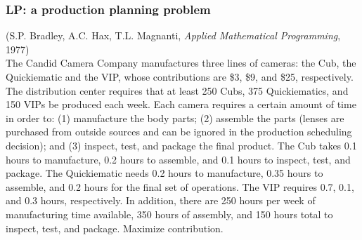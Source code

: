 \documentclass[landscape]{beamer}
\begin{document}
\begin{frame}
  \frametitle{LP: a production planning problem}
\begin{footnotesize}  
(S.P. Bradley, A.C. Hax, T.L. Magnanti, \emph{Applied Mathematical Programming}, 1977)\\
The Candid Camera Company manufactures three lines of cameras: the Cub, the Quickiematic and the VIP, whose
contributions are \$3, \$9, and \$25, respectively. 
 The distribution center requires that at least 250 Cubs, 375 Quickiematics,
and 150 VIPs be produced each week.
Each camera requires a certain amount of time in order to: (1) manufacture the body parts; (2) assemble the
parts (lenses are purchased from outside sources and can be ignored in the production scheduling decision); and (3)
inspect, test, and package the final product. The Cub takes 0.1 hours to manufacture, 0.2 hours to assemble, and 0.1
hours to inspect, test, and package. The Quickiematic needs 0.2 hours to manufacture, 0.35 hours to assemble, and
0.2 hours for the final set of operations. The VIP requires 0.7, 0.1, and 0.3 hours, respectively. In addition, there
are 250 hours per week of manufacturing time available, 350 hours of assembly, and 150 hours total to inspect, test,
and package.
Maximize contribution. 
\end{footnotesize}
  \end{frame}  
\end{document}
